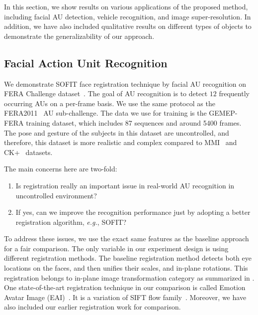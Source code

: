 \documentclass[10pt,journal]{IEEEtran}
\begin{document}
In this section, we show results on various applications of the proposed method, including facial AU detection, vehicle recognition, and image super-resolution. In addition, we have also included qualitative results on different types of objects to demonstrate the generalizability of our approach.

\subsection{Facial Action Unit Recognition}

We demonstrate SOFIT face registration technique by facial AU recognition on FERA Challenge dataset~\cite{FERA11}. The goal of AU recognition is to detect $12$ frequently occurring AUs on a per-frame basis. We use the same protocol as the FERA2011~\cite{Valstar_FERA11} AU sub-challenge. The data we use for training is the GEMEP-FERA training dataset, which includes 87 sequences and around 5400 frames. The pose and gesture of the subjects in this dataset are uncontrolled, and therefore, this dataset is more realistic and complex compared to MMI~\cite{Pantic_ICME05} and CK+~\cite{Kanade_FG00} datasets.

The main concerns here are two-fold:
\begin{enumerate}
\item Is registration really an important issue in real-world AU recognition in uncontrolled environment?
\item If yes, can we improve the recognition performance just by adopting a better registration algorithm, \textit{e.g.}, SOFIT?
\end{enumerate}

To address these issues, we use the exact same features as the baseline approach for a fair comparison. The only variable in our experiment design is using different registration methods. The baseline registration method detects both eye locations on the faces, and then unifies their scales, and in-plane rotations. This registration belongs to in-plane image transformation category as summarized in \cite{Yang_SMCB12}. One state-of-the-art registration technique in our comparison is called Emotion Avatar Image (EAI)~\cite{Yang_SMCB12}. It is a variation of SIFT flow family~\cite{Liu_PAMI11}. Moreover, we have also included our earlier registration work \cite{Yang_FG13} for comparison.
\end{document}
